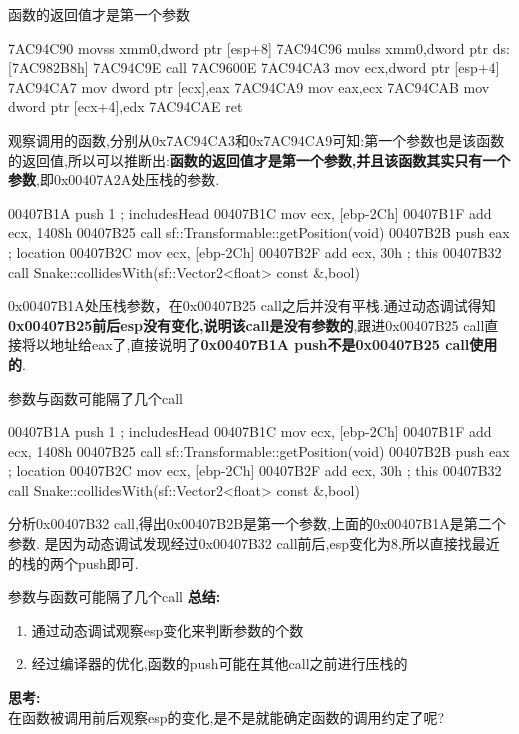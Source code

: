 \documentclass[AutoFakeBold,AutoFakeSlant]{beamer}
\begin{document}
	\begin{frame}[fragile]{函数的返回值才是第一个参数}
		\begin{x86asmcode}
7AC94C90  movss  xmm0,dword ptr [esp+8]  
7AC94C96  mulss  xmm0,dword ptr ds:[7AC982B8h]  
7AC94C9E  call   7AC9600E  
7AC94CA3  mov    ecx,dword ptr [esp+4]  
7AC94CA7  mov    dword ptr [ecx],eax  
7AC94CA9  mov    eax,ecx  
7AC94CAB  mov    dword ptr [ecx+4],edx  
7AC94CAE  ret \end{x86asmcode}
		观察调用的函数,分别从0x7AC94CA3和0x7AC94CA9可知:第一个参数也是该函数的返回值,所以可以推断出:\textbf{函数的返回值才是第一个参数,并且该函数其实只有一个参数},即0x00407A2A处压栈的参数.
	\end{frame}
	
	
	\begin{frame}[fragile]
		\begin{x86asmcode}
00407B1A  push    1 ; includesHead
00407B1C  mov     ecx, [ebp-2Ch]
00407B1F  add     ecx, 1408h
00407B25  call    sf::Transformable::getPosition(void)
00407B2B  push    eax ; location
00407B2C  mov     ecx, [ebp-2Ch]
00407B2F  add     ecx, 30h ; this
00407B32  call    Snake::collidesWith(sf::Vector2<float> const &,bool)\end{x86asmcode}
		0x00407B1A处压栈参数，在0x00407B25 call之后并没有平栈.通过动态调试得知\textbf{0x00407B25前后esp没有变化,说明该call是没有参数的},跟进0x00407B25 call直接将以地址给eax了,直接说明了\textbf{0x00407B1A push不是0x00407B25 call使用的}.	
	\end{frame}
	
		\begin{frame}[fragile]{参数与函数可能隔了几个call}
		\begin{x86asmcode}
00407B1A  push    1 ; includesHead
00407B1C  mov     ecx, [ebp-2Ch]
00407B1F  add     ecx, 1408h
00407B25  call    sf::Transformable::getPosition(void)
00407B2B  push    eax ; location
00407B2C  mov     ecx, [ebp-2Ch]
00407B2F  add     ecx, 30h ; this
00407B32  call    Snake::collidesWith(sf::Vector2<float> const &,bool)\end{x86asmcode}
		分析0x00407B32 call,得出0x00407B2B是第一个参数,上面的0x00407B1A是第二个参数.	是因为动态调试发现经过0x00407B32 call前后,esp变化为8,所以直接找最近的栈的两个push即可.
	\end{frame}
	
	\begin{frame}[fragile]{参数与函数可能隔了几个call}
		\textbf{总结:}
		\begin{enumerate}
			\item 通过动态调试观察esp变化来判断参数的个数
			\item 经过编译器的优化,函数的push可能在其他call之前进行压栈的
		\end{enumerate}
		\textbf{思考:} \\ 
		在函数被调用前后观察esp的变化,是不是就能确定函数的调用约定了呢?
	\end{frame}
	
\end{document}
